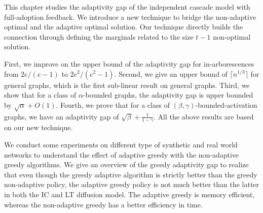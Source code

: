 This chapter studies the adaptivity gap of the independent cascade model with full-adoption feedback. We introduce a new technique to bridge the non-adaptive optimal and the adaptive optimal solution. Our technique directly builds the connection through defining the marginals related to the size $t-1$ non-optimal solution. 

First, we improve on the upper bound of the adaptivity gap for in-arborescences from $2e/(e-1)$ to $2e^2/(e^2-1)$. Second, we give an upper bound of $\lceil n^{1/3} \rceil$ for general graphs, which is the first sub-linear result on general graphs. Third, we show that for a class of $\alpha$-bounded graphs, the adaptivity gap is upper bounded by $\sqrt{\alpha}+O(1)$. Fourth, we prove that for a class of $(\beta,\gamma)$-bounded-activation graphs, we have an adaptivity gap of $\sqrt{\beta}+\frac{1}{1-\gamma}$. All the above results are based on our new technique.

We conduct some experiments on different type of synthetic and real world networks to understand the effect of adaptive greedy with the non-adaptive greedy algorithms. We give an overview of the greedy adaptivity gap to realize that even though the greedy adaptive algorithm is strictly better than the greedy non-adaptive policy, the adaptive greedy policy is not much better than the latter in both the IC and LT diffusion model. The adaptive greedy is memory efficient, whereas the non-adaptive greedy has a better efficiency in time.